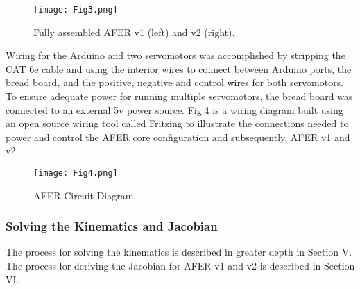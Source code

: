\begin{figure}[h!]
\texttt{[image: Fig3.png]}
\caption{Fully assembled AFER v1 (left) and v2 (right).}
\label{3}
\end{figure}

Wiring for the Arduino and two servomotors was accomplished by stripping the CAT 6e cable and using the interior wires to connect between Arduino ports, the bread board, and the positive, negative and control wires for both servomotors. To ensure adequate power for running multiple servomotors, the bread board was connected to an external 5v power source. Fig.4 is a wiring diagram built using an open source wiring tool called Fritzing to illustrate the connections needed to power and control the AFER core configuration and subsequently, AFER v1 and v2.

\begin{figure}[h!]
\texttt{[image: Fig4.png]}
\caption{AFER Circuit Diagram.}
\label{4}
\end{figure}

\subsubsection{Solving the Kinematics and Jacobian}
The process for solving the kinematics is described in greater depth in Section V. The process for deriving the Jacobian for AFER v1 and v2 is described in Section VI.

